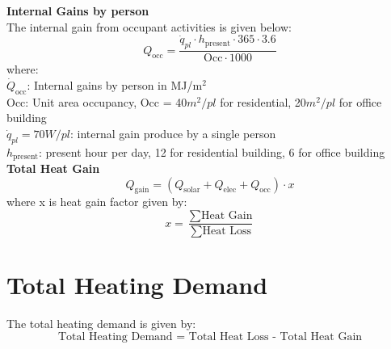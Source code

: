 \documentclass[a4paper, oneside]{discothesis}
\begin{document}
	\textbf{Internal Gains by person}\\
	The internal gain from occupant activities is given below:\\

	\[Q_{\text{occ}} = \frac{\dot{q}_{pl} \cdot h_{\text{present}} \cdot 365 \cdot 3.6}{\text{Occ} \cdot  1000}\]
	where:\\
	$\dot{Q}_{\text{occ}}$: Internal gains by person in MJ/m$^2$\\
	$\text{Occ}$: Unit area occupancy, Occ = 40$m^2/pl$ for residential, 20$m^2/pl$ for office building\\
	$\dot{q}_{pl} = 70W/pl$: internal gain produce by a single person\\
	$h_{\text{present}}$: present hour per day, 12 for residential building, 6 for office building\\



	\textbf{Total Heat Gain}\\
	\[Q_{\text{gain}} = (Q_{\text{solar}} + Q_{\text{elec}} + Q_{\text{occ}}) \cdot x\]
	where x is heat gain factor given by:
	\[ x = \frac{\sum \text{Heat Gain}}{\sum \text{Heat Loss}}\]
	\newpage
	\section{Total Heating Demand}
	The total heating demand is given by:
	\[\text{Total Heating Demand = Total Heat Loss - Total Heat Gain}\]
\end{document}
